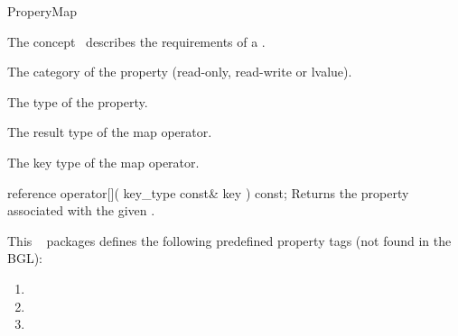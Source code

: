 
\begin{ccRefConcept}{ProperyMap}


\ccDefinition

The concept \ccRefName\ describes the requirements of a .

\ccTypes
   {The category of the property (read-only, read-write or lvalue).}{}
  
   {The type of the property.}{}
    
   {The result type of the map operator.}{}
    
   {The key type of the map operator.}{}


\ccOperations

\ccMethod
  {reference operator[]( key_type const& key ) const;}
  {Returns the property associated with the given .}  

This \cgal\  packages defines the following predefined property tags (not found in the BGL):

\begin{enumerate}
\item {}
\item {}
\item {}
\end{enumerate}
  
\ccHasModels
{}\\
\\
\\
\\
\\

\end{ccRefConcept}



